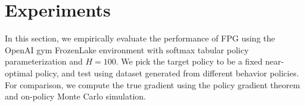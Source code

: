 \documentclass{article}
\newtheorem{theorem}{Theorem}[section]
\numberwithin{equation}{section}
\begin{document}
\begin{comment}
\section{Distributional Consistency of Bootstrap FQE Estimator}
Recall the original dataset $\mathcal{D}$ consists of $K$ episodes. We propose to bootstrap FPG by episodes: Draw sample episodes $\mathcal{D}_1^*, \ldots, \mathcal{D}_K^*$ independently with replacement from $\mathcal{D}$. Then we run FPG on the new bootstrapped set $\mathcal{D}^* = \{\mathcal{D}_1^*,\ldots, \mathcal{D}_K^*\}$  let the output $\widehat{\nabla_\theta v_\theta^*}$ be the bootstrapping FPG estimator. By repeating the above process, we may obtain multiple samples of $\widehat{\nabla_\theta v_\theta^*}$, and may use these samples to further conduct off-policy inference. In this section, we show that the bootstrapping FPG method is distributionally consistent. More precisely, we prove that the bootstrap distribution distribution of $\sqrt{N}\left(\widehat{\nabla_\theta v_\theta^*}-\widehat{\nabla_\theta v_\theta}\right)$, conditioned on the data $\mathcal{D}$, asymptotically imitates the true error distribution of $\sqrt{N}\left(\widehat{\nabla_\theta v_\theta}-\nabla_\theta v_\theta\right)$. Consequently, we may use the method to construct confidence regions with asymptotically correct and tight coverage. 
\begin{theorem}
\label{dis_cons}
Conditioned on $\mathcal{D}$, we have
\begin{align*}
    \sqrt{N}\left(\widehat{\nabla_\theta v_\theta^*}-\widehat{\nabla_\theta v_\theta}\right)\stackrel{d}{\rightarrow}\mathcal{N}(0,\Lambda_\theta)\ \mathrm{as}\ N\rightarrow\infty.
\end{align*} 
\end{theorem}
The complete proof of Theorem \ref{dis_cons} is deferred to Appendix \ref{pfdis_cons}. 
\end{comment}

\rm
\section{Experiments}
In this section, we empirically evaluate the performance of FPG using the OpenAI gym FrozenLake environment with softmax tabular policy parameterization and $H=100$. 
We pick the target policy to be a fixed near-optimal policy, and test using dataset generated from different behavior policies. For comparison, we compute the true gradient using the policy gradient theorem and on-policy Monte Carlo simulation.
\end{document}
